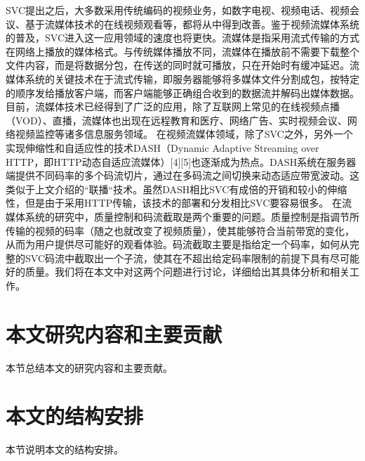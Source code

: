 SVC提出之后，大多数采用传统编码的视频业务，如数字电视、视频电话、视频会议、基于流媒体技术的在线视频观看等，都将从中得到改善。鉴于视频流媒体系统的普及，SVC进入这一应用领域的速度也将更快。流媒体是指采用流式传输的方式在网络上播放的媒体格式。与传统媒体播放不同，流媒体在播放前不需要下载整个文件内容，而是将数据分包，在传送的同时就可播放，只在开始时有缓冲延迟。流媒体系统的关键技术在于流式传输，即服务器能够将多媒体文件分割成包，按特定的顺序发给播放客户端，而客户端能够正确组合收到的数据流并解码出媒体数据。目前，流媒体技术已经得到了广泛的应用，除了互联网上常见的在线视频点播（VOD）、直播，流媒体也出现在远程教育和医疗、网络广告、实时视频会议、网络视频监控等诸多信息服务领域。
在视频流媒体领域，除了SVC之外，另外一个实现伸缩性和自适应性的技术DASH（Dynamic Adaptive Streaming over HTTP，即HTTP动态自适应流媒体）[4][5]也逐渐成为热点。DASH系统在服务器端提供不同码率的多个码流切片，通过在多码流之间切换来动态适应带宽波动。这类似于上文介绍的“联播“技术。虽然DASH相比SVC有成倍的开销和较小的伸缩性，但是由于采用HTTP传输，该技术的部署和分发相比SVC要容易很多。
在流媒体系统的研究中，质量控制和码流截取是两个重要的问题。质量控制是指调节所传输的视频的码率（随之也就改变了视频质量），使其能够符合当前带宽的变化，从而为用户提供尽可能好的观看体验。码流截取主要是指给定一个码率，如何从完整的SVC码流中截取出一个子流，使其在不超出给定码率限制的前提下具有尽可能好的质量。我们将在本文中对这两个问题进行讨论，详细给出其具体分析和相关工作。



\section{本文研究内容和主要贡献}
本节总结本文的研究内容和主要贡献。

\section{本文的结构安排}
本节说明本文的结构安排。